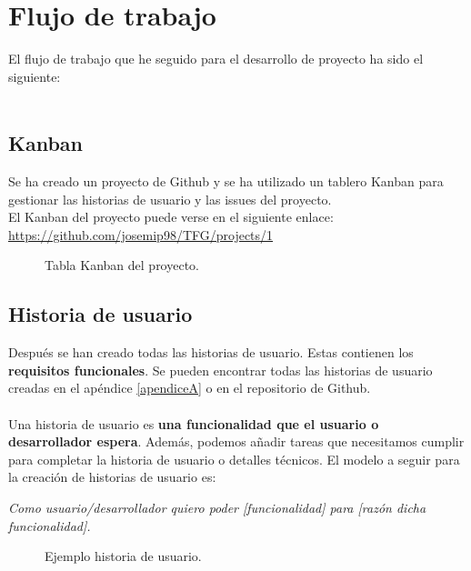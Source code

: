 \section{Flujo de trabajo} \label{sec:flujo_trabajo}

El flujo de trabajo que he seguido para el desarrollo de proyecto ha sido el siguiente:\\\\

\subsection{Kanban}

Se ha creado un proyecto de Github y se ha utilizado un tablero Kanban para gestionar las historias de usuario y las issues del proyecto.\\

El Kanban del proyecto puede verse en el siguiente enlace:
\url{https://github.com/josemip98/TFG/projects/1}

\begin{figure}[H]
  	\centering
  	\noindent{}
  	\caption{Tabla Kanban del proyecto.}
	\end{figure}

\subsection{Historia de usuario}

Después se han creado todas las historias de usuario. Estas contienen los \textbf{requisitos funcionales}.
Se pueden encontrar todas las historias de usuario creadas en el apéndice \ref*{apendiceA} o en el repositorio de Github\cite{user-stories}.\\\\
Una historia de usuario es \textbf{una funcionalidad que el usuario o desarrollador espera}.
Además, podemos añadir tareas que necesitamos cumplir para completar la historia de usuario o detalles técnicos.
El modelo a seguir para la creación de historias de usuario es:
 
\textit{Como usuario/desarrollador quiero poder [funcionalidad] para [razón dicha funcionalidad].}

\begin{figure}[H]
	\centering
	\noindent{}
	\caption{Ejemplo historia de usuario.}
  	\end{figure}

